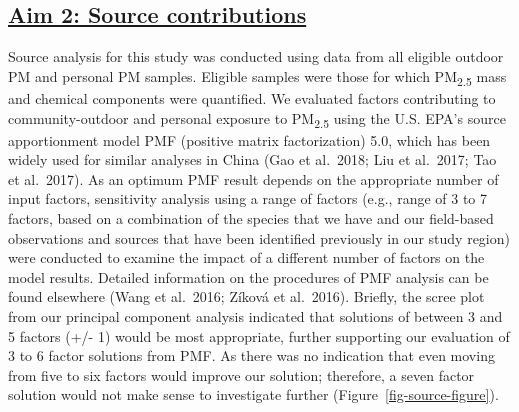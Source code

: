 \documentclass[
  letterpaper,
  DIV=11,
  numbers=noendperiod]{scrartcl}
\providecommand{\DIFadd}[1]{{\protect\color{blue}\underline{#1}}} %
\providecommand{\DIFaddbegin}{} %
\providecommand{\DIFaddend}{} %
\providecommand{\DIFdelbegin}{} %
\providecommand{\DIFdelend}{} %
\newcommand{\DIFscaledelfig}{0.5}
\newlength{\DIFdelgraphicswidth} %
\newlength{\DIFdelgraphicsheight} %
\newcommand{\DIFaddincludegraphics}[2][]{{\color{blue}\fbox{\DIFOincludegraphics[#1]{#2}}}} %
\newcommand{\DIFdelincludegraphics}[2][]{%
\sbox{\DIFdelgraphicsbox}{\DIFOincludegraphics[#1]{#2}}%
\settoboxwidth{\DIFdelgraphicswidth}{\DIFdelgraphicsbox} %
\settoboxtotalheight{\DIFdelgraphicsheight}{\DIFdelgraphicsbox} %
\scalebox{\DIFscaledelfig}{%
\parbox[b]{\DIFdelgraphicswidth}{\usebox{\DIFdelgraphicsbox}\\[-\baselineskip] \rule{\DIFdelgraphicswidth}{0em}}\llap{\resizebox{\DIFdelgraphicswidth}{\DIFdelgraphicsheight}{%
\setlength{\unitlength}{\DIFdelgraphicswidth}%
\begin{picture}(1,1)%
\thicklines\linethickness{2pt} %
{\color[rgb]{1,0,0}\put(0,0){\framebox(1,1){}}}%
{\color[rgb]{1,0,0}\put(0,0){\line( 1,1){1}}}%
{\color[rgb]{1,0,0}\put(0,1){\line(1,-1){1}}}%
\end{picture}%
}\hspace*{3pt}}} %
} %
\DeclareRobustCommand{\DIFaddbegin}{\DIFOaddbegin \let\includegraphics\DIFaddincludegraphics} %
\DeclareRobustCommand{\DIFaddend}{\DIFOaddend \let\includegraphics\DIFOincludegraphics} %
\DeclareRobustCommand{\DIFdelbegin}{\DIFOdelbegin \let\includegraphics\DIFdelincludegraphics} %
\DeclareRobustCommand{\DIFdelend}{\DIFOaddend \let\includegraphics\DIFOincludegraphics} %
\begin{document}
\DIFdelbegin %
\DIFdelend \DIFaddbegin \subsection{\DIFadd{Aim 2: Source
contributions}}\label{aim-2-source-contributions}
\DIFaddend 

Source analysis for this study was conducted using data from all
eligible outdoor PM and personal PM samples. Eligible samples were those
for which PM\textsubscript{2.5} mass and chemical components were
quantified. We evaluated factors contributing to community-outdoor and
personal exposure to PM\textsubscript{2.5} using the U.S. EPA's source
apportionment model PMF (positive matrix factorization) 5.0, which has
been widely used for similar analyses in China (Gao et al.~2018; Liu et
al.~2017; Tao et al.~2017). As an optimum PMF result depends on the
appropriate number of input factors, sensitivity analysis using a range
of factors (e.g., range of 3 to 7 factors, based on a combination of the
species that we have and our field-based observations and sources that
have been identified previously in our study region) were conducted to
examine the impact of a different number of factors on the model
results. Detailed information on the procedures of PMF analysis can be
found elsewhere (Wang et al.~2016; Zíková et al.~2016). Briefly, the
scree plot from our principal component analysis indicated that
solutions of between 3 and 5 factors (+/- 1) would be most appropriate,
further supporting our evaluation of 3 to 6 factor solutions from PMF.
As there was no indication that even moving from five to six factors
would improve our solution; therefore, a seven factor solution would not
make sense to investigate further (Figure~\ref{fig-source-figure}).
\end{document}
